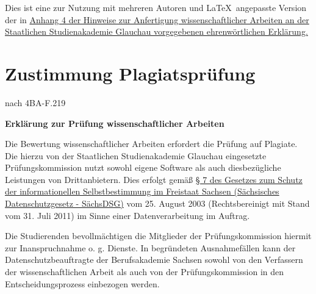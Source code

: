 \vfill

{\footnotesize Dies ist eine zur Nutzung mit mehreren Autoren und \LaTeX\ angepasste Version der in \href{https://www.ba-glauchau.de/fileadmin/glauchau/waehrend-des-studium/dokumente/pruefungen/4BA-F.207_Hinweise_zur_Anfertigung_wissenschaftlicher_Arbeiten.pdf}{Anhang 4 der Hinweise zur Anfertigung wissenschaftlicher Arbeiten an der Staatlichen Studienakademie Glauchau vorgegebenen ehrenwörtlichen Erklärung.}}


\clearpage
\section{Zustimmung Plagiatsprüfung}

\vspace*{2mm}

\begin{minipage}{0.5\columnwidth}

\end{minipage}
\begin{minipage}{0.45\columnwidth}
\begin{flushright}
{\small nach 4BA-F.219\\}
\end{flushright}
\end{minipage}
\vspace*{2mm}

\begin{center}\textbf{\huge{Erklärung zur Prüfung wissenschaftlicher Arbeiten}}\end{center}

Die Bewertung wissenschaftlicher Arbeiten erfordert die Prüfung auf Plagiate. Die hierzu von der Staatlichen Studienakademie Glauchau eingesetzte Prüfungskommission nutzt sowohl eigene Software als auch diesbezügliche Leistungen von Drittanbietern. Dies erfolgt gemäß \href{https://www.revosax.sachsen.de/vorschrift/1672-Saechsisches-Datenschutzgesetz#p7}{§ 7 des Gesetzes zum Schutz der informationellen Selbstbestimmung im Freistaat Sachsen (Sächsisches Datenschutzgesetz - SächsDSG)} vom 25. August 2003 (Rechtsbereinigt mit Stand vom 31. Juli 2011) im Sinne einer Datenverarbeitung im Auftrag.

Die Studierenden bevollmächtigen die Mitglieder der Prüfungskommission hiermit zur Inanspruchnahme o. g. Dienste. In begründeten Ausnahmefällen kann der Datenschutzbeauftragte der Berufsakademie Sachsen sowohl von den Verfassern der wissenschaftlichen Arbeit als auch von der Prüfungskommission in den Entscheidungsprozess einbezogen werden.

